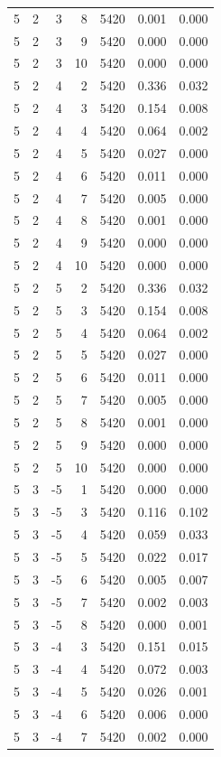 \begin{table}
\begin{tabular}{rrrrrrr}
5 & 2 & 3 & 8 & 5420 & 0.001 & 0.000 \\
5 & 2 & 3 & 9 & 5420 & 0.000 & 0.000 \\
5 & 2 & 3 & 10 & 5420 & 0.000 & 0.000 \\
5 & 2 & 4 & 2 & 5420 & 0.336 & 0.032 \\
5 & 2 & 4 & 3 & 5420 & 0.154 & 0.008 \\
5 & 2 & 4 & 4 & 5420 & 0.064 & 0.002 \\
5 & 2 & 4 & 5 & 5420 & 0.027 & 0.000 \\
5 & 2 & 4 & 6 & 5420 & 0.011 & 0.000 \\
5 & 2 & 4 & 7 & 5420 & 0.005 & 0.000 \\
5 & 2 & 4 & 8 & 5420 & 0.001 & 0.000 \\
5 & 2 & 4 & 9 & 5420 & 0.000 & 0.000 \\
5 & 2 & 4 & 10 & 5420 & 0.000 & 0.000 \\
5 & 2 & 5 & 2 & 5420 & 0.336 & 0.032 \\
5 & 2 & 5 & 3 & 5420 & 0.154 & 0.008 \\
5 & 2 & 5 & 4 & 5420 & 0.064 & 0.002 \\
5 & 2 & 5 & 5 & 5420 & 0.027 & 0.000 \\
5 & 2 & 5 & 6 & 5420 & 0.011 & 0.000 \\
5 & 2 & 5 & 7 & 5420 & 0.005 & 0.000 \\
5 & 2 & 5 & 8 & 5420 & 0.001 & 0.000 \\
5 & 2 & 5 & 9 & 5420 & 0.000 & 0.000 \\
5 & 2 & 5 & 10 & 5420 & 0.000 & 0.000 \\
5 & 3 & -5 & 1 & 5420 & 0.000 & 0.000 \\
5 & 3 & -5 & 3 & 5420 & 0.116 & 0.102 \\
5 & 3 & -5 & 4 & 5420 & 0.059 & 0.033 \\
5 & 3 & -5 & 5 & 5420 & 0.022 & 0.017 \\
5 & 3 & -5 & 6 & 5420 & 0.005 & 0.007 \\
5 & 3 & -5 & 7 & 5420 & 0.002 & 0.003 \\
5 & 3 & -5 & 8 & 5420 & 0.000 & 0.001 \\
5 & 3 & -4 & 3 & 5420 & 0.151 & 0.015 \\
5 & 3 & -4 & 4 & 5420 & 0.072 & 0.003 \\
5 & 3 & -4 & 5 & 5420 & 0.026 & 0.001 \\
5 & 3 & -4 & 6 & 5420 & 0.006 & 0.000 \\
5 & 3 & -4 & 7 & 5420 & 0.002 & 0.000 \\

\end{tabular}
\end{table}
